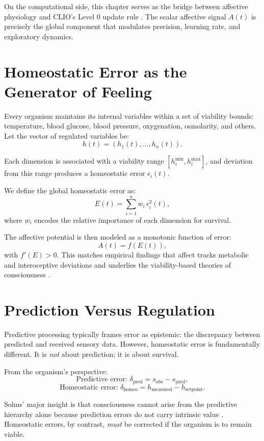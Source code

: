 \documentclass[12pt,oneside]{book}
\theoremstyle{plain}
\theoremstyle{definition}
\let\citep\parencite
\begin{document}
On the computational side, this chapter serves as the bridge between
affective physiology and CLIO’s Level 0 update rule
\citep{cheng2025cognitive}.
The scalar affective signal $A(t)$ is precisely the global component
that modulates precision, learning rate, and exploratory dynamics.

\section{Homeostatic Error as the Generator of Feeling}

Every organism maintains its internal variables within a set of viability
bounds:
temperature,
blood glucose,
blood pressure,
oxygenation,
osmolarity,
and others.
Let the vector of regulated variables be:
\[
h(t) = (h_1(t),\dots,h_n(t)).
\]

Each dimension is associated with a viability range
$[h_i^{\min}, h_i^{\max}]$,
and deviation from this range produces a homeostatic error
$\epsilon_i(t)$.

We define the global homeostatic error as:
\[
E(t) = \sum_{i=1}^n w_i \, \epsilon_i^2(t),
\]
where $w_i$ encodes the relative importance of each dimension for survival.

The affective potential is then modeled as a monotonic function of error:
\[
A(t) = f(E(t)),
\]
with $f'(E) > 0$.
This matches empirical findings that affect tracks metabolic and
interoceptive deviations \citep{khalsa2018interoception} and underlies the
viability-based theories of consciousness
\citep{solms2021hidden,friston2017active}.

\section{Prediction Versus Regulation}

Predictive processing typically frames error as epistemic:
the discrepancy between predicted and received sensory data.
However, homeostatic error is fundamentally different.
It is \emph{not} about prediction; it is about survival.

From the organism’s perspective:
\[
\text{Predictive error: } \delta_{\text{pred}} = s_{\text{obs}} - s_{\text{pred}},
\]
\[
\text{Homeostatic error: } \delta_{\text{homeo}} = h_{\text{measured}} - h_{\text{setpoint}}.
\]

Solms’ major insight is that consciousness cannot arise from the predictive
hierarchy alone because prediction errors do not carry intrinsic value
\citep{solms2021hidden}.
Homeostatic errors, by contrast, \emph{must} be corrected if the organism is
to remain viable.
\end{document}
